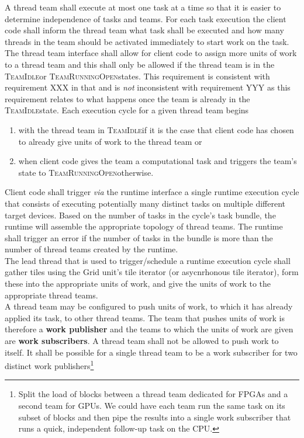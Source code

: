 \documentclass{article}
\newcommand{\TeamIdle}          {\textsc{TeamIdle}}
\newcommand{\TeamRunningOpen}   {\textsc{TeamRunningOpen}}
\begin{document}
A thread team shall execute at most one task at a time so that it is easier to
determine independence of tasks and teams.  For each task execution the client
code shall inform the thread team what task shall be executed and how many
threads in the team should be activated immediately to start work on the task.\\

The thread team interface shall allow for client code to assign more units of
work to a thread team and this shall only be allowed if the thread team is in the
\TeamIdle or \TeamRunningOpen states.  This requirement is consistent with
requirement XXX in that and is \emph{not} inconsistent with requirement YYY as
this requirement relates to what happens once the team is already in the
\TeamIdle state.  Each execution cycle for a given thread team begins
\begin{enumerate}
\item{with the thread team in \TeamIdle if it is the case that client code has
chosen to already give units of work to the thread team or}
\item{when client code gives the team a computational task and triggers the
team's state to \TeamRunningOpen otherwise.}
\end{enumerate}

Client code shall trigger \textit{via} the runtime interface a single runtime
execution cycle that consists of executing potentially many distinct tasks on
multiple different target devices.  Based on the number of tasks in the cycle's
task bundle, the runtime will assemble the appropriate topology of thread teams.
The runtime shall trigger an error if the number of tasks in the bundle is more
than the number of thread teams created by the runtime.\\

The lead thread that is used to trigger/schedule a runtime execution cycle shall
gather tiles using the Grid unit's tile iterator (or asycnrhonous tile
iterator), form these into the appropriate units of work, and give the units of
work to the appropriate thread teams.\\

A thread team may be configured to push units of work, to which it has already
applied its task, to other thread teams.  The team that pushes units of work is
therefore a \textbf{work publisher} and the teams to which the units of work are
given are \textbf{work subscribers}.  A thread team shall not be allowed to push
work to itself.  It shall be possible for a single thread team to be a work
subscriber for two distinct work publishers\footnote{Split the load of blocks
between a thread team dedicated for FPGAs and a second team for GPUs.  We could
have each team run the same task on its subset of blocks and then pipe the
results into a single work subscriber that runs a quick, independent follow-up
task on the CPU.}\\
\end{document}

